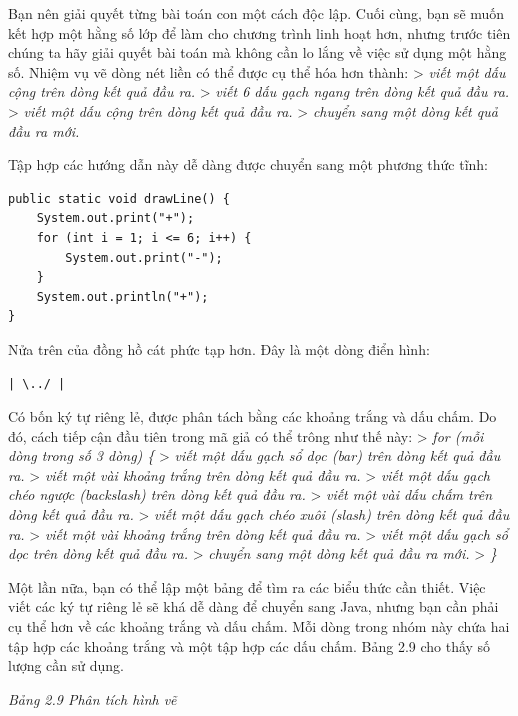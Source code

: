 Bạn nên giải quyết từng bài toán con một cách độc lập. Cuối cùng, bạn sẽ
muốn kết hợp một hằng số lớp để làm cho chương trình linh hoạt hơn,
nhưng trước tiên chúng ta hãy giải quyết bài toán mà không cần lo lắng
về việc sử dụng một hằng số. Nhiệm vụ vẽ dòng nét liền có thể được cụ
thể hóa hơn thành: \textgreater{} \emph{viết một dấu cộng trên dòng kết
quả đầu ra.} \textgreater{} \emph{viết 6 dấu gạch ngang trên dòng kết
quả đầu ra.} \textgreater{} \emph{viết một dấu cộng trên dòng kết quả
đầu ra.} \textgreater{} \emph{chuyển sang một dòng kết quả đầu ra mới.}

Tập hợp các hướng dẫn này dễ dàng được chuyển sang một phương thức tĩnh:

\begin{verbatim}
public static void drawLine() {
    System.out.print("+");
    for (int i = 1; i <= 6; i++) {
        System.out.print("-");
    }
    System.out.println("+");
}
\end{verbatim}

Nửa trên của đồng hồ cát phức tạp hơn. Đây là một dòng điển hình:

\begin{verbatim}
| \../ |
\end{verbatim}

Có bốn ký tự riêng lẻ, được phân tách bằng các khoảng trắng và dấu chấm.
Do đó, cách tiếp cận đầu tiên trong mã giả có thể trông như thế này:
\textgreater{} \emph{for (mỗi dòng trong số 3 dòng) \{} \textgreater{}
\emph{viết một dấu gạch sổ dọc (bar) trên dòng kết quả đầu ra.}
\textgreater{} \emph{viết một vài khoảng trắng trên dòng kết quả đầu
ra.} \textgreater{} \emph{viết một dấu gạch chéo ngược (backslash) trên
dòng kết quả đầu ra.} \textgreater{} \emph{viết một vài dấu chấm trên
dòng kết quả đầu ra.} \textgreater{} \emph{viết một dấu gạch chéo xuôi
(slash) trên dòng kết quả đầu ra.} \textgreater{} \emph{viết một vài
khoảng trắng trên dòng kết quả đầu ra.} \textgreater{} \emph{viết một
dấu gạch sổ dọc trên dòng kết quả đầu ra.} \textgreater{} \emph{chuyển
sang một dòng kết quả đầu ra mới.} \textgreater{} \emph{\}}

Một lần nữa, bạn có thể lập một bảng để tìm ra các biểu thức cần thiết.
Việc viết các ký tự riêng lẻ sẽ khá dễ dàng để chuyển sang Java, nhưng
bạn cần phải cụ thể hơn về các khoảng trắng và dấu chấm. Mỗi dòng trong
nhóm này chứa hai tập hợp các khoảng trắng và một tập hợp các dấu chấm.
Bảng 2.9 cho thấy số lượng cần sử dụng.

\emph{Bảng 2.9 Phân tích hình vẽ}

